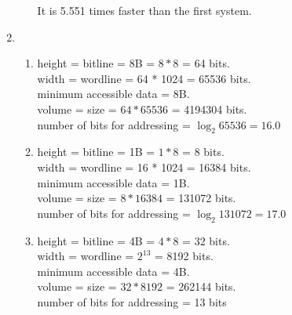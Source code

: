 \documentclass[12pt]{article}
\begin{document}
\begin{enumerate}
\begin{enumerate}
                It is 5.551 times faster than the first system.
        \end{enumerate}
    \item
        \begin{enumerate}
            \item
                height = bitline = 8B = $8*8$ = 64 bits.\\
                width = wordline = 64 * 1024 = 65536 bits.\\
                minimum accessible data = 8B. \\
                volume = size = $64*65536$ = 4194304 bits.\\
                number of bits for addressing = $\log_2{65536}=16.0$
            \item
                height = bitline = 1B = $1*8$ = 8 bits.\\
                width = wordline = 16 * 1024 = 16384 bits.\\
                minimum accessible data = 1B. \\
                volume = size = $8*16384$ = 131072 bits.\\
                number of bits for addressing = $\log_2{131072}=17.0$
            \item
                height = bitline = 4B = $4*8$ = 32 bits.\\
                width = wordline = $2^{13}$ = 8192 bits.\\
                minimum accessible data = 4B. \\
                volume = size = $32*8192$ = 262144 bits.\\
                number of bits for addressing = 13 bits\\

        \end{enumerate}

\end{enumerate}
\end{document}
